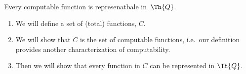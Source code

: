 \documentclass[../../include/open-logic-section]{subfiles}
\begin{document}

\begin{lem}
Every computable function is represenatbale in~$\Th{Q}$.
\end{lem}

\begin{enumerate}
\item We will define a set of (total) functions, $C$.
\item We will show that $C$ is the set of computable
  functions, i.e.\ our definition provides another characterization of
  computability.
\item Then we will show that every function in $C$ can be represented in
  $\Th{Q}$.
\end{enumerate}
\end{document}
